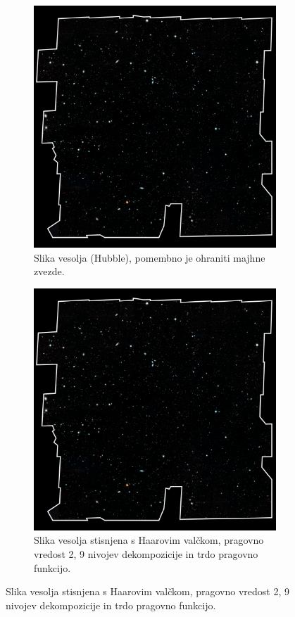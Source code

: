 \documentclass[a4paper,11pt]{article}
\begin{document}
\begin{figure}
\begin{subfigure}[t]{0.48\textwidth}
\includegraphics[width=1\textwidth]{images/hubble2000x2000.png}
\caption{Slika vesolja (Hubble), pomembno je ohraniti majhne zvezde.} \label{slika4}
\end{subfigure}
\hspace*{\fill} %
\begin{subfigure}[t]{0.48\textwidth}
\includegraphics[width=1\textwidth]{images/report/hubble2000x2000_comp.png}
\caption{Slika vesolja stisnjena s Haarovim valčkom, pragovno vredost 2, 9 nivojev dekompozicije in trdo pragovno funkcijo.} \label{slika4:comp}
\end{subfigure}
\end{figure}
\end{document}
